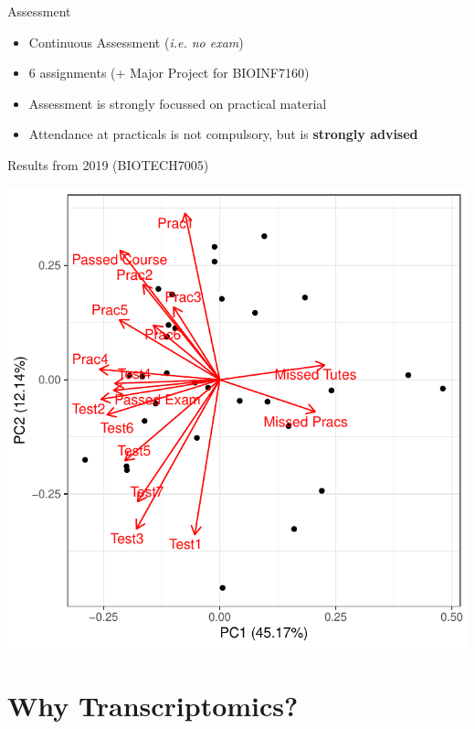 \documentclass[aspectratio=169,11pt]{beamer}
\begin{document}
\begin{frame}{Assessment}

	\begin{itemize}
		\item Continuous Assessment (\textit{i.e. no exam})
		\item 6 assignments (+ Major Project for BIOINF7160)
		\item Assessment is strongly focussed on practical material
		\item Attendance at practicals is not compulsory, but is \textbf{strongly advised}
	\end{itemize}

\end{frame}

\begin{frame}{Results from 2019 (BIOTECH7005)}

	\begin{center}
	\includegraphics[scale=0.5]{figures/biotech7005_2019pca.pdf} 	
	\end{center}

\end{frame}

\section{Why Transcriptomics?}
\end{document}
